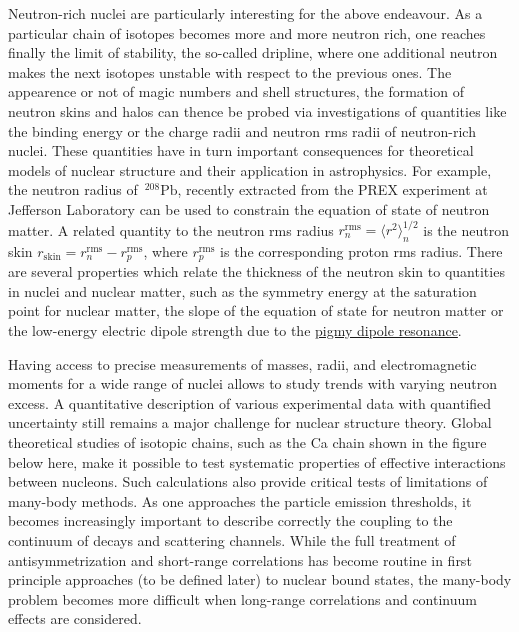 \documentclass[%
twoside,                 %
final,                   %
10pt]{article}
\begin{document}
Neutron-rich nuclei are particularly interesting for the above endeavour. As a particular chain
of isotopes becomes more and more neutron rich, one reaches finally the limit of stability, the so-called
dripline, where one additional neutron makes the next isotopes unstable with respect 
to the previous ones. The appearence or not of magic numbers and shell structures,
the formation of neutron skins and halos
can thence be probed via investigations of quantities like  the binding energy
or the charge radii and neutron rms radii of neutron-rich nuclei. 
These quantities have in turn important 
consequences for theoretical models of nuclear structure and their application in astrophysics.
For example, the neutron radius of $\,{}^{208}\mbox{Pb}$, recently extracted from the PREX 
experiment at Jefferson Laboratory  can be used to constrain the equation of state of 
neutron matter. A related quantity to the
neutron rms radius $r_n^{\mathrm{rms}}=\langle r^2\rangle_n^{1/2}$ is the neutron skin 
$r_{\mathrm{skin}}=r_n^{\mathrm{rms}}-r_p^{\mathrm{rms}}$,
where $r_p^{\mathrm{rms}}$ is the corresponding proton rms radius.  
There are several properties which relate the thickness of the neutron skin to quantities in nuclei and 
nuclear matter, such as the symmetry energy at the saturation point for nuclear matter, the slope
of the equation of state for neutron matter
or the low-energy electric dipole strength due to the \href{{http://iopscience.iop.org/1402-4896/2013/T152}}{pigmy dipole resonance}.


Having access to precise measurements of masses, radii, and
electromagnetic moments for a wide range of nuclei allows to study
trends with varying neutron excess. A quantitative description of
various experimental data with quantified uncertainty still remains a
major challenge for nuclear structure theory.  Global theoretical
studies of isotopic chains, such as the Ca chain shown in the figure below here, make it possible to test systematic
properties of effective interactions between nucleons. Such calculations also
provide critical tests of limitations of many-body methods. As one
approaches the particle emission thresholds, it becomes increasingly
important to describe correctly the coupling to the continuum of
decays and scattering channels. While the
full treatment of antisymmetrization and short-range correlations has
become routine in first principle  approaches (to be defined later) to nuclear bound states, the
many-body problem becomes more difficult when long-range correlations
and continuum effects are considered.
\end{document}
